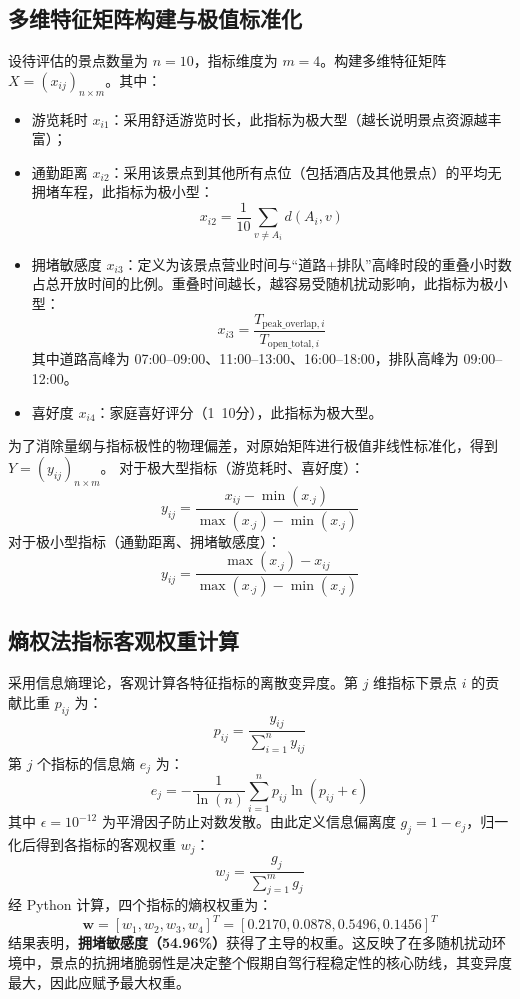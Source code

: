 \documentclass{cumcmthesis}
\begin{document}
\subsection{多维特征矩阵构建与极值标准化}
设待评估的景点数量为 $n=10$，指标维度为 $m=4$。构建多维特征矩阵 $X = (x_{ij})_{n \times m}$。其中：
\begin{itemize}
\item 游览耗时 $x_{i1}$：采用舒适游览时长，此指标为极大型（越长说明景点资源越丰富）；
\item 通勤距离 $x_{i2}$：采用该景点到其他所有点位（包括酒店及其他景点）的平均无拥堵车程，此指标为极小型：
\begin{equation}
x_{i2} = \frac{1}{10} \sum_{v \ne A_i} d(A_i, v)
\end{equation}
\item 拥堵敏感度 $x_{i3}$：定义为该景点营业时间与“道路+排队”高峰时段的重叠小时数占总开放时间的比例。重叠时间越长，越容易受随机扰动影响，此指标为极小型：
\begin{equation}
x_{i3} = \frac{T_{\text{peak\_overlap}, i}}{T_{\text{open\_total}, i}}
\end{equation}
其中道路高峰为 07:00--09:00、11:00--13:00、16:00--18:00，排队高峰为 09:00--12:00。
\item 喜好度 $x_{i4}$：家庭喜好评分（1~10分），此指标为极大型。
\end{itemize}
为了消除量纲与指标极性的物理偏差，对原始矩阵进行极值非线性标准化，得到 $Y = (y_{ij})_{n \times m}$。
对于极大型指标（游览耗时、喜好度）：
\begin{equation}
y_{ij} = \frac{x_{ij} - \min(x_{\cdot j})}{\max(x_{\cdot j}) - \min(x_{\cdot j})}
\end{equation}
对于极小型指标（通勤距离、拥堵敏感度）：
\begin{equation}
y_{ij} = \frac{\max(x_{\cdot j}) - x_{ij}}{\max(x_{\cdot j}) - \min(x_{\cdot j})}
\end{equation}
\subsection{熵权法指标客观权重计算}
采用信息熵理论，客观计算各特征指标的离散变异度\cite{ref7, ref8}。第 $j$ 维指标下景点 $i$ 的贡献比重 $p_{ij}$ 为：
\begin{equation}
p_{ij} = \frac{y_{ij}}{\sum_{i=1}^{n} y_{ij}}
\end{equation}
第 $j$ 个指标的信息熵 $e_j$ 为：
\begin{equation}
e_j = -\frac{1}{\ln(n)} \sum_{i=1}^{n} p_{ij} \ln(p_{ij} + \epsilon)
\end{equation}
其中 $\epsilon = 10^{-12}$ 为平滑因子防止对数发散。由此定义信息偏离度 $g_j = 1 - e_j$，归一化后得到各指标的客观权重 $w_j$：
\begin{equation}
w_j = \frac{g_j}{\sum_{j=1}^{m} g_j}
\end{equation}
经 Python 计算，四个指标的熵权权重为：
\begin{equation}
\mathbf{w} = [w_1, w_2, w_3, w_4]^T = [0.2170, 0.0878, 0.5496, 0.1456]^T
\end{equation}
结果表明，\textbf{拥堵敏感度（54.96\%）}获得了主导的权重。这反映了在多随机扰动环境中，景点的抗拥堵脆弱性是决定整个假期自驾行程稳定性的核心防线，其变异度最大，因此应赋予最大权重。
\end{document}
